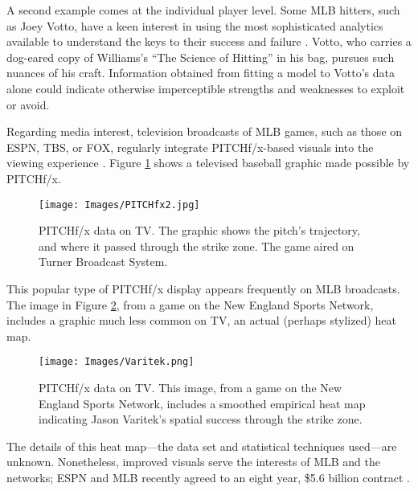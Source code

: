 A second example comes at the individual player level. Some MLB\textsuperscript{\textregistered} hitters, such as Joey Votto, have a keen interest in using the most sophisticated analytics available to understand the keys to their success and failure \citep{Daugherty2015}. Votto, who carries a dog-eared copy of Williams's ``The Science of Hitting'' in his bag, pursues such nuances of his craft. Information obtained from fitting a model to Votto's data alone could indicate otherwise imperceptible strengths and weaknesses to exploit or avoid. 

Regarding media interest, television broadcasts of MLB\textsuperscript{\textregistered} games, such as those on ESPN, TBS, or FOX, regularly integrate PITCHf/x\textsuperscript{\textregistered}-based visuals into the viewing experience \citep{Cross2015}. Figure \ref{fig:fx2} shows a televised baseball graphic made possible by PITCHf/x\textsuperscript{\textregistered}.
        \begin{figure}[H]
      	\centering
      	\texttt{[image: Images/PITCHfx2.jpg]} 
      	\caption{PITCHf/x\textsuperscript{\textregistered} data on TV. The graphic shows the pitch's trajectory, and where it passed through the strike zone. The game aired on Turner Broadcast System.} %
      	\label{fig:fx2}
      	\end{figure} 
This popular type of PITCHf/x\textsuperscript{\textregistered} display appears frequently on MLB\textsuperscript{\textregistered} broadcasts. The image in Figure \ref{fig:fx3}, from a game on the New England Sports Network, includes a graphic much less common on TV, an actual (perhaps stylized) heat map.
        \begin{figure}[H]
      	\centering
      	\texttt{[image: Images/Varitek.png]} 
      	\caption{PITCHf/x\textsuperscript{\textregistered} data on TV. This image, from a game on the New England Sports Network, includes a smoothed empirical heat map indicating Jason Varitek's spatial success through the strike zone.} 
      	\label{fig:fx3}
      	\end{figure} 
The details of this heat map---the data set and statistical techniques used---are unknown. Nonetheless, improved visuals serve the interests of MLB\textsuperscript{\textregistered} and the networks; ESPN\textsuperscript{\textregistered} and MLB\textsuperscript{\textregistered} recently agreed to an eight year, \$5.6 billion contract \citep{Newman2012}.

